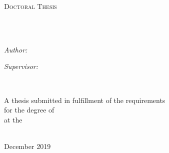 \documentclass[
    12pt, %
    singlespacing, %
    headsepline, %
]{DoctoralThesis} %
\author{Dimitrios \textsc{Pritsos}}
\begin{document}
\frontmatter %

\pagestyle{plain} %


\begin{titlepage}
\begin{center}

\vspace*{.06\textheight}
{\scshape\LARGE \univname\par}\vspace{1.5cm} %
\textsc{\Large Doctoral Thesis}\\[0.5cm] %

\HRule \\[0.4cm] %
{\huge \bfseries \ttitle\par}\vspace{0.4cm} %
\HRule \\[1.5cm] %

\begin{minipage}[t]{0.4\textwidth}
\begin{flushleft} \large
\emph{Author:}\\
\href{http://www.aegean.gr}{\authorname} %
\end{flushleft}
\end{minipage}
\begin{minipage}[t]{0.4\textwidth}
\begin{flushright} \large
\emph{Supervisor:} \\
\href{http://www.aegean.gr}{\supname} %
\end{flushright}
\end{minipage}\\[3cm]

\vfill

\large A thesis submitted in fulfillment of the requirements\\ for the degree of \degreename\\[0.3cm] %
at the\\[0.4cm]
\deptname\\[2cm] %

\vfill

{\large December 2019}\\[4cm] %

\vfill
\end{center}
\end{titlepage}
\end{document}
